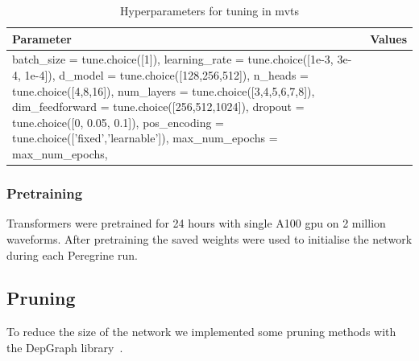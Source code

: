 \begin{table}[h]
    \centering
    \caption{Hyperparameters for tuning in mvts}
    \label{tab:config_parameters}
    \begin{tabular}{@{}ll@{}}
    \toprule
    Parameter       & Values \\ 
    \midrule
    batch_size = tune.choice([1]),
    learning_rate = tune.choice([1e-3, 3e-4, 1e-4]),
    d_model = tune.choice([128,256,512]),
    n_heads = tune.choice([4,8,16]),
    num_layers = tune.choice([3,4,5,6,7,8]),
    dim_feedforward = tune.choice([256,512,1024]),
    dropout = tune.choice([0, 0.05, 0.1]),
    pos_encoding = tune.choice(['fixed','learnable']),
    max_num_epochs = max_num_epochs,
    \end{tabular}
\end{table}

\subsubsection{Pretraining}

Transformers were pretrained for 24 hours with single A100 gpu on 2 million waveforms. After pretraining the saved weights were used to initialise the network during each Peregrine run.


\subsection{Pruning}

To reduce the size of the network we implemented some pruning methods with the DepGraph library~\cite{Fang_Ma_Song_Mi_Wang_2023}.






